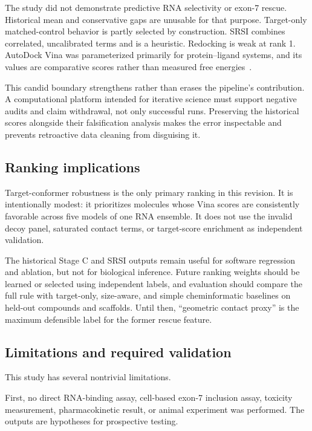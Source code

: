 \documentclass[journal]{IEEEtran}
\begin{document}
The study did not demonstrate predictive RNA selectivity or exon-7
rescue. Historical mean and conservative gaps are unusable for that
purpose. Target-only matched-control behavior is partly selected by
construction. SRSI combines correlated, uncalibrated terms and is a
heuristic. Redocking is weak at rank 1. AutoDock Vina was parameterized
primarily for protein--ligand systems, and its values are comparative
scores rather than measured free energies~\cite{trott2010,eberhardt2021,
agarwal2023,gunasinghe2024}.

This candid boundary strengthens rather than erases the pipeline's
contribution. A computational platform intended for iterative science
must support negative audits and claim withdrawal, not only successful
runs. Preserving the historical scores alongside their falsification
analysis makes the error inspectable and prevents retroactive data
cleaning from disguising it.

\subsection{Ranking implications}

Target-conformer robustness is the only primary ranking in this
revision. It is intentionally modest: it prioritizes molecules whose
Vina scores are consistently favorable across five models of one RNA
ensemble. It does not use the invalid decoy panel, saturated contact
terms, or target-score enrichment as independent validation.

The historical Stage C and SRSI outputs remain useful for software
regression and ablation, but not for biological inference. Future
ranking weights should be learned or selected using independent labels,
and evaluation should compare the full rule with target-only, size-aware,
and simple cheminformatic baselines on held-out compounds and scaffolds.
Until then, ``geometric contact proxy'' is the maximum defensible label
for the former rescue feature.

\subsection{Limitations and required validation}

This study has several nontrivial limitations.

First, no direct RNA-binding assay, cell-based exon-7 inclusion assay,
toxicity measurement, pharmacokinetic result, or animal experiment was
performed. The outputs are hypotheses for prospective testing.
\end{document}
